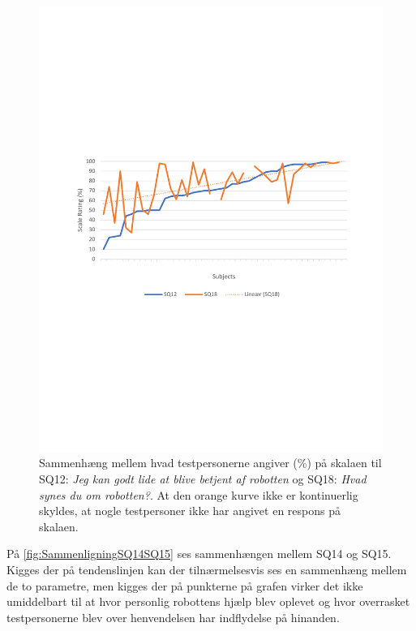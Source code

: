 \begin{figure}[H]
	\centering
	\includegraphics[width=\textwidth]{Figure/Korrelationsgrafer/SQ12+SQ18}
	\caption{Sammenhæng mellem hvad testpersonerne angiver (\%) på skalaen til SQ12: \textit{Jeg kan godt lide at blive betjent af robotten} og SQ18: \textit{Hvad synes du om robotten?}. At den orange kurve ikke er kontinuerlig skyldes, at nogle testpersoner ikke har angivet en respons på skalaen.}
	\label{fig:SammenligningSQ12SQ18}
\end{figure}
\noindent
%
På \autoref{fig:SammenligningSQ14SQ15} ses sammenhængen mellem SQ14 og SQ15. Kigges der på tendenslinjen kan der tilnærmelsesvis ses en sammenhæng mellem de to parametre, men kigges der på punkterne på grafen virker det ikke umiddelbart til at hvor personlig robottens hjælp blev oplevet og hvor overrasket testpersonerne blev over henvendelsen har indflydelse på hinanden.
%
